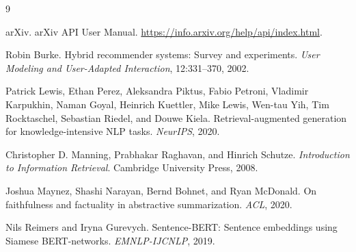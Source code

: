 \documentclass{article}
\begin{document}
\begin{thebibliography}{9}

arXiv.
\newblock arXiv API User Manual.
\newblock \url{https://info.arxiv.org/help/api/index.html}.

Robin Burke.
\newblock Hybrid recommender systems: Survey and experiments.
\newblock \emph{User Modeling and User-Adapted Interaction}, 12:331--370, 2002.

Patrick Lewis, Ethan Perez, Aleksandra Piktus, Fabio Petroni, Vladimir Karpukhin, Naman Goyal, Heinrich Kuettler, Mike Lewis, Wen-tau Yih, Tim Rocktaschel, Sebastian Riedel, and Douwe Kiela.
\newblock Retrieval-augmented generation for knowledge-intensive NLP tasks.
\newblock \emph{NeurIPS}, 2020.

Christopher D. Manning, Prabhakar Raghavan, and Hinrich Schutze.
\newblock \emph{Introduction to Information Retrieval}.
\newblock Cambridge University Press, 2008.

Joshua Maynez, Shashi Narayan, Bernd Bohnet, and Ryan McDonald.
\newblock On faithfulness and factuality in abstractive summarization.
\newblock \emph{ACL}, 2020.

Nils Reimers and Iryna Gurevych.
\newblock Sentence-BERT: Sentence embeddings using Siamese BERT-networks.
\newblock \emph{EMNLP-IJCNLP}, 2019.

\end{thebibliography}
\end{document}
